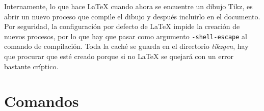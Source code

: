 \documentclass[nochap]{apuntes}
\begin{document}
Internamente, lo que hace LaTeX cuando ahora se encuentre un dibujo Tikz, es abrir un nuevo proceso que compile el dibujo y después incluirlo en el documento. Por seguridad, la configuración por defecto de LaTeX impide la creación de nuevos procesos, por lo que hay que pasar como argumento \texttt{-shell-escape} al comando de compilación. Toda la caché se guarda en el directorio \textit{tikzgen}, hay que procurar que esté creado porque si no LaTeX se quejará con un error bastante críptico.

\section{Comandos}

\setcounter{LTchunksize}{10}
\renewcommand{\arraystretch}{1.5}%


\newpage
\printindex
\end{document}
